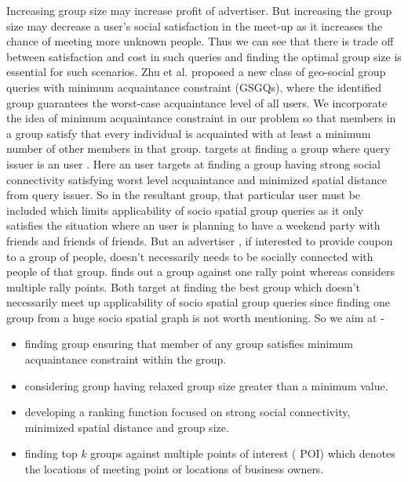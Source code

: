 \documentclass{vldb}
\begin{document}
		
		Increasing group size may increase profit of advertiser. But increasing the group size may decrease a user's social satisfaction in the meet-up as it increases the chance of meeting more unknown people. Thus we can see that there is trade off between satisfaction and cost in such queries and finding the optimal group size is essential for such scenarios.  Zhu et al.  \cite{zhu2014geo} proposed a new class of geo-social group queries with minimum acquaintance constraint (GSGQs), where the identified group guarantees the worst-case acquaintance level of all users. We incorporate the idea of minimum acquaintance constraint in our problem so that members in a group satisfy that every individual is acquainted with at least a minimum number of other members in that group. \cite{zhu2014geo} 
		targets at finding a group where query issuer is  an user . Here an user targets at finding a group having strong social connectivity satisfying worst level acquaintance and minimized 
		spatial distance from query issuer. So in the resultant group, that particular user must be included which limits applicability of socio spatial group queries as it only satisfies the situation where an user is planning to have a weekend party with friends and friends of friends. But an advertiser , if interested to provide coupon to a group of people, doesn't necessarily needs to be socially connected with people of that group. \cite{yang2012socio}  finds out a group against one rally point whereas \cite{shen2016socio} considers multiple rally points. Both target at finding the best group which doesn't necessarily meet up applicability of  socio spatial group queries since finding one group from a huge socio spatial graph is not worth mentioning. So we aim at -
		\begin{itemize}
		\item finding group ensuring that member of any group satisfies minimum acquaintance constraint within the group.
		
		\item considering group having relaxed group size greater than a minimum value.
		
		\item developing a ranking function focused on strong social connectivity, minimized spatial distance and group size.
								
		\item finding top $ k $ groups against multiple points of interest ( POI) which denotes the locations of meeting point or locations of business owners.
		
		\end{itemize}
		
\end{document}
